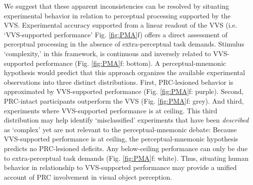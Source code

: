 \documentclass[11pt]{article}
\begin{document}
We suggest that these apparent inconsistencies can be resolved by situating experimental behavior in relation to perceptual processing supported by the VVS. Experimental accuracy supported from a linear readout of the VVS (i.e. `VVS-supported performance' Fig. \ref{fig:PMA}f) offers a direct assessment of perceptual processing in the absence of extra-perceptual task demands. Stimulus `complexity,' in this framework, is continuous and inversely related to VVS-supported performance (Fig. \ref{fig:PMA}f: bottom). A perceptual-mnemonic hypothesis would predict that this approach organizes the available experimental observations into three distinct distributions. First, PRC-lesioned behavior is approximated by VVS-supported performance (Fig. \ref{fig:PMA}f: purple). Second, PRC-intact participants outperform the VVS (Fig. \ref{fig:PMA}f: grey). And third, experiments where VVS-supported performance is at ceiling. This third distribution may help identify `misclassified' experiments that have been \textit{described} as `complex' yet are not relevant to the perceptual-mnemonic debate: Because VVS-supported performance is at ceiling, the perceptual-mnemonic hypothesis predicts no PRC-lesioned deficits. Any below-ceiling performance can only be due to extra-perceptual task demands (Fig. \ref{fig:PMA}f: white). Thus, situating human behavior in relationship to VVS-supported performance may provide a unified account of PRC involvement in visual object perception.
\end{document}
